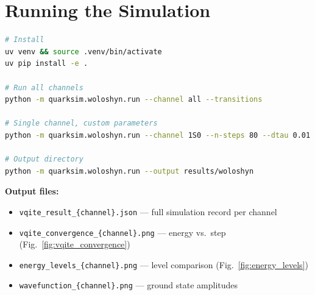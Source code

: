 \documentclass[11pt,a4paper]{article}
\begin{document}
\section{Running the Simulation}

\begin{lstlisting}[language=bash]
# Install
uv venv && source .venv/bin/activate
uv pip install -e .

# Run all channels
python -m quarksim.woloshyn.run --channel all --transitions

# Single channel, custom parameters
python -m quarksim.woloshyn.run --channel 1S0 --n-steps 80 --dtau 0.01

# Output directory
python -m quarksim.woloshyn.run --output results/woloshyn
\end{lstlisting}

\textbf{Output files:}
\begin{itemize}[nosep]
  \item \texttt{vqite\_result\_\{channel\}.json} --- full simulation record per channel
  \item \texttt{vqite\_convergence\_\{channel\}.png} --- energy vs.\ step (Fig.~\ref{fig:vqite_convergence})
  \item \texttt{energy\_levels\_\{channel\}.png} --- level comparison (Fig.~\ref{fig:energy_levels})
  \item \texttt{wavefunction\_\{channel\}.png} --- ground state amplitudes
\end{itemize}
\end{document}
